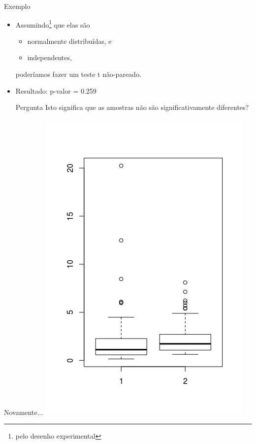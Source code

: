 \documentclass{beamer}
\begin{document}
\begin{frame}{Exemplo}
  \begin{itemize}
  \item<1-> Assumindo\footnote{pelo desenho experimental} que elas são
    \begin{itemize}
    \item<1-> \alert<3>{normalmente distribuídas}, e
    \item<1-> independentes,
    \end{itemize}
poderíamos fazer um teste t não-pareado.

  \item<2-> Resultado: p-valor = \alert{0.259}
  \begin{block}{Pergunta}
    Isto significa que as amostras não são significativamente diferentes?
  \end{block}
  \end{itemize}
\end{frame}

\begin{frame}{Novamente...}
  \centering
  \includegraphics[height=\textheight]{Nao_Param/2samples-bp}
\end{frame}
\end{document}
